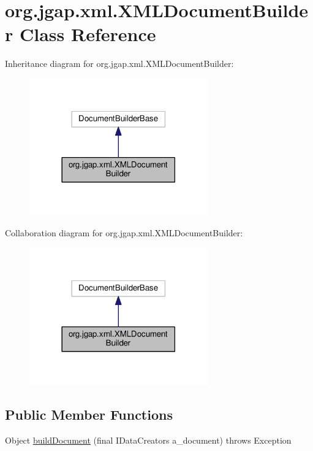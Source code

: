 \hypertarget{classorg_1_1jgap_1_1xml_1_1_x_m_l_document_builder}{\section{org.\-jgap.\-xml.\-X\-M\-L\-Document\-Builder Class Reference}
\label{classorg_1_1jgap_1_1xml_1_1_x_m_l_document_builder}
}


Inheritance diagram for org.\-jgap.\-xml.\-X\-M\-L\-Document\-Builder\-:
\nopagebreak
\begin{figure}[H]
\begin{center}
\leavevmode
\includegraphics[width=218pt]{classorg_1_1jgap_1_1xml_1_1_x_m_l_document_builder__inherit__graph}
\end{center}
\end{figure}


Collaboration diagram for org.\-jgap.\-xml.\-X\-M\-L\-Document\-Builder\-:
\nopagebreak
\begin{figure}[H]
\begin{center}
\leavevmode
\includegraphics[width=218pt]{classorg_1_1jgap_1_1xml_1_1_x_m_l_document_builder__coll__graph}
\end{center}
\end{figure}
\subsection*{Public Member Functions}
\begin{DoxyCompactItemize}
\item 
Object \hyperlink{classorg_1_1jgap_1_1xml_1_1_x_m_l_document_builder_aa4518664bef2a9bd592b1c37c8bb3ec0}{build\-Document} (final I\-Data\-Creators a\-\_\-document)  throws Exception 
\end{DoxyCompactItemize}
